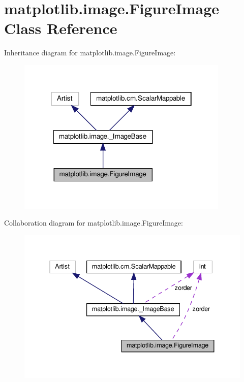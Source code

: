 \hypertarget{classmatplotlib_1_1image_1_1FigureImage}{}\section{matplotlib.\+image.\+Figure\+Image Class Reference}
\label{classmatplotlib_1_1image_1_1FigureImage}


Inheritance diagram for matplotlib.\+image.\+Figure\+Image\+:
\nopagebreak
\begin{figure}[H]
\begin{center}
\leavevmode
\includegraphics[width=286pt]{classmatplotlib_1_1image_1_1FigureImage__inherit__graph}
\end{center}
\end{figure}


Collaboration diagram for matplotlib.\+image.\+Figure\+Image\+:
\nopagebreak
\begin{figure}[H]
\begin{center}
\leavevmode
\includegraphics[width=338pt]{classmatplotlib_1_1image_1_1FigureImage__coll__graph}
\end{center}
\end{figure}

